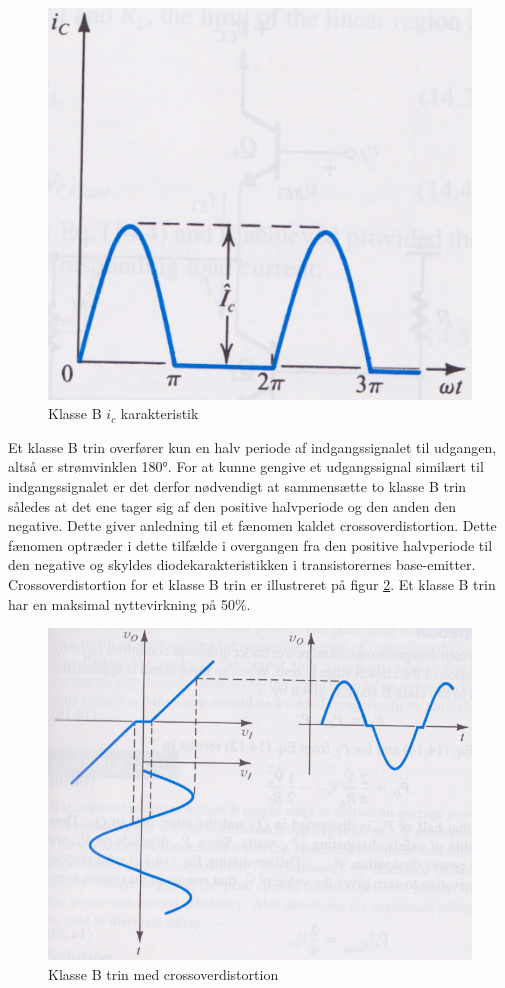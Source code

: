 \begin{figure}[h]
\centering
\includegraphics[scale=.35]{indledende_analyse/klasser/klasseb.png}
\caption{Klasse B $i_c$ karakteristik}
\label{fig:klasseb}
\end{figure}

Et klasse B trin overfører kun en halv periode af indgangssignalet til udgangen, altså er strømvinklen 180°. For at kunne gengive et udgangssignal similært til indgangssignalet er det derfor nødvendigt at sammensætte to klasse B trin således at det ene tager sig af den positive halvperiode og den anden den negative. Dette giver anledning til et fænomen kaldet crossoverdistortion. Dette fænomen optræder i dette tilfælde i overgangen fra den positive halvperiode til den negative og skyldes diodekarakteristikken i transistorernes base-emitter. Crossoverdistortion for et klasse B trin er illustreret på figur \ref{fig:classbproblem}.
Et klasse B trin har en maksimal nyttevirkning på 50\%.

\begin{figure}[h]
\centering
\includegraphics[scale=.35]{indledende_analyse/klasser/klassebproblem.png}
\caption{Klasse B trin med crossoverdistortion}
\label{fig:classbproblem}
\end{figure}

